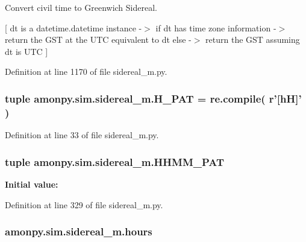 Convert civil time to Greenwich Sidereal. 

\mbox{[} dt is a datetime.\-datetime instance -\/$>$ if dt has time zone information -\/$>$ return the G\-S\-T at the U\-T\-C equivalent to dt else -\/$>$ return the G\-S\-T assuming dt is U\-T\-C \mbox{]} 

Definition at line 1170 of file sidereal\-\_\-m.\-py.

\hypertarget{namespaceamonpy_1_1sim_1_1sidereal__m_a73fee03d46d8b2421dbeb60f71462365}{
\subsubsection[{H\-\_\-\-P\-A\-T}]{\setlength{\rightskip}{0pt plus 5cm}tuple amonpy.\-sim.\-sidereal\-\_\-m.\-H\-\_\-\-P\-A\-T = re.\-compile( r'\mbox{[}h\-H\mbox{]}' )}}\label{namespaceamonpy_1_1sim_1_1sidereal__m_a73fee03d46d8b2421dbeb60f71462365}


Definition at line 33 of file sidereal\-\_\-m.\-py.

\hypertarget{namespaceamonpy_1_1sim_1_1sidereal__m_a0f6ab1a75753c104eefed365e14aad4a}{
\subsubsection[{H\-H\-M\-M\-\_\-\-P\-A\-T}]{\setlength{\rightskip}{0pt plus 5cm}tuple amonpy.\-sim.\-sidereal\-\_\-m.\-H\-H\-M\-M\-\_\-\-P\-A\-T}}\label{namespaceamonpy_1_1sim_1_1sidereal__m_a0f6ab1a75753c104eefed365e14aad4a}
{\bfseries Initial value\-:}


Definition at line 329 of file sidereal\-\_\-m.\-py.

\hypertarget{namespaceamonpy_1_1sim_1_1sidereal__m_ab57a43b87f961c10d7510aba50c02942}{
\subsubsection[{hours}]{\setlength{\rightskip}{0pt plus 5cm}amonpy.\-sim.\-sidereal\-\_\-m.\-hours}}\label{namespaceamonpy_1_1sim_1_1sidereal__m_ab57a43b87f961c10d7510aba50c02942}


